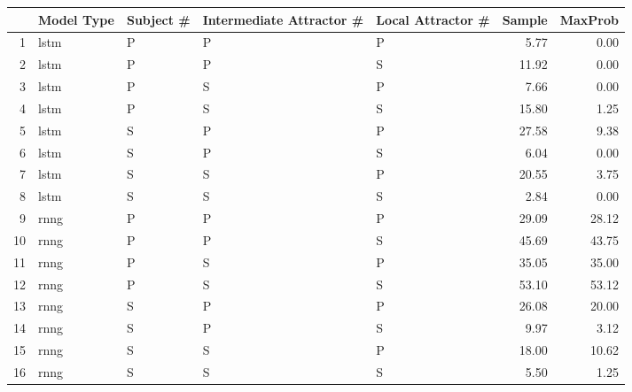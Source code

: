 \begin{tabular}{rllllrr}
  \hline
 & Model Type & Subject \# & Intermediate Attractor \# & Local Attractor \# & Sample & MaxProb \\ 
  \hline
1 & lstm & P & P & P & 5.77 & 0.00 \\ 
  2 & lstm & P & P & S & 11.92 & 0.00 \\ 
  3 & lstm & P & S & P & 7.66 & 0.00 \\ 
  4 & lstm & P & S & S & 15.80 & 1.25 \\ 
  5 & lstm & S & P & P & 27.58 & 9.38 \\ 
  6 & lstm & S & P & S & 6.04 & 0.00 \\ 
  7 & lstm & S & S & P & 20.55 & 3.75 \\ 
  8 & lstm & S & S & S & 2.84 & 0.00 \\ 
  9 & rnng & P & P & P & 29.09 & 28.12 \\ 
  10 & rnng & P & P & S & 45.69 & 43.75 \\ 
  11 & rnng & P & S & P & 35.05 & 35.00 \\ 
  12 & rnng & P & S & S & 53.10 & 53.12 \\ 
  13 & rnng & S & P & P & 26.08 & 20.00 \\ 
  14 & rnng & S & P & S & 9.97 & 3.12 \\ 
  15 & rnng & S & S & P & 18.00 & 10.62 \\ 
  16 & rnng & S & S & S & 5.50 & 1.25 \\ 
   \hline
\end{tabular}
